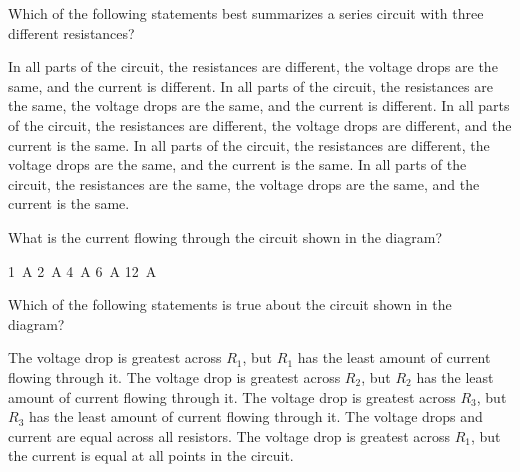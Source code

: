 \documentclass{../../../oss-classkick-exam}
\begin{document}
\genheader


\genmultidirections

\gengravity

\raggedcolumns
\begin{multicols*}{2}
  \begin{questions}
    \question Which of the following statements best summarizes a series circuit
    with three different resistances?
    \begin{choices}
      \choice In all parts of the circuit, the resistances are different, the
      voltage drops are the same, and the current is different.
      \choice In all parts of the circuit, the resistances are the same, the
      voltage drops are the same, and the current is different.
      \choice In all parts of the circuit, the resistances are different, the
      voltage drops are different, and the current is the same.
      \choice In all parts of the circuit, the resistances are different, the
      voltage drops are the same, and the current is the same.
      \choice In all parts of the circuit, the resistances are the same, the
      voltage drops are the same, and the current is the same.
    \end{choices}
    \vspace{.7in}

    \question What is the current flowing through the circuit shown in the
    diagram?
    \begin{choices}
      \choice\SI{1}{\ampere}
      \choice\SI{2}{\ampere}
      \choice\SI{4}{\ampere}
      \choice\SI{6}{\ampere}
      \choice\SI{12}{\ampere}
    \end{choices}
    \label{series1}
    
    \question Which of the following statements is true about the circuit shown
    in the diagram?
    \begin{choices}
      \choice The voltage drop is greatest across $R_1$, but $R_1$ has the least
      amount of current flowing through it.
      \choice The voltage drop is greatest across $R_2$, but $R_2$ has the least
      amount of current flowing through it.
      \choice The voltage drop is greatest across $R_3$, but $R_3$ has the least
      amount of current flowing through it.
      \choice The voltage drops and current are equal across all resistors.
      \choice The voltage drop is greatest across $R_1$, but the current is
      equal at all points in the circuit.
    \end{choices}
    \vspace{.7in}
    

\end{questions}
\end{multicols*}
\end{document}
